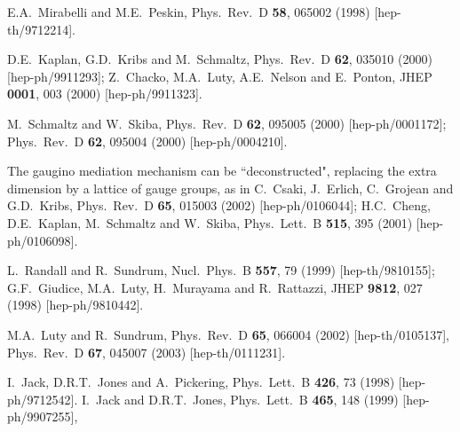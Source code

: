 \documentclass[11pt]{article}
\begin{document}
\begin{thebibliography}{999}
E.A.~Mirabelli and M.E.~Peskin,
  Phys.\ Rev.\ D {\bf 58}, 065002 (1998)
  [hep-th/9712214].

  D.E.~Kaplan, G.D.~Kribs and M.~Schmaltz,
  Phys.\ Rev.\ D {\bf 62}, 035010 (2000)
  [hep-ph/9911293];
  Z.~Chacko, M.A.~Luty, A.E.~Nelson and E.~Ponton,
  JHEP {\bf 0001}, 003 (2000)
  [hep-ph/9911323].

M.~Schmaltz and W.~Skiba,
  Phys.\ Rev.\ D {\bf 62}, 095005 (2000)
  [hep-ph/0001172];
  Phys.\ Rev.\ D {\bf 62}, 095004 (2000)
  [hep-ph/0004210].

The gaugino mediation mechanism can be ``deconstructed", replacing the
extra dimension by a lattice of gauge groups, as in
C.~Csaki, J.~Erlich, C.~Grojean and G.D.~Kribs,
  Phys.\ Rev.\ D {\bf 65}, 015003 (2002)
  [hep-ph/0106044];
H.C.~Cheng, D.E.~Kaplan, M.~Schmaltz and W.~Skiba,
  Phys.\ Lett.\ B {\bf 515}, 395 (2001)
  [hep-ph/0106098].

L.~Randall and R.~Sundrum,
  Nucl.\ Phys.\ B {\bf 557}, 79 (1999)
  [hep-th/9810155];
G.F.~Giudice, M.A.~Luty, H.~Murayama and R.~Rattazzi,
  JHEP {\bf 9812}, 027 (1998)
  [hep-ph/9810442].

M.A.~Luty and R.~Sundrum,
  Phys.\ Rev.\ D {\bf 65}, 066004 (2002)
  [hep-th/0105137],
  Phys.\ Rev.\ D {\bf 67}, 045007 (2003)
  [hep-th/0111231].
  
I.~Jack, D.R.T.~Jones and A.~Pickering,
  Phys.\ Lett.\ B {\bf 426}, 73 (1998)
  [hep-ph/9712542].
I.~Jack and D.R.T.~Jones,
  Phys.\ Lett.\ B {\bf 465}, 148 (1999)
  [hep-ph/9907255],


\end{thebibliography}
\end{document}
